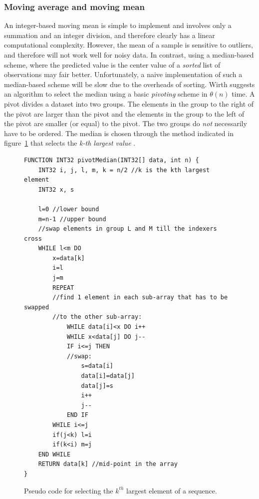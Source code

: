  \subsubsection{Moving average and moving mean}
  An integer-based moving mean is simple to implement and involves only a summation and an integer division, and therefore clearly has a linear computational complexity.
  However, the mean of a sample is sensitive to outliers, and therefore will not work well for noisy data. In contrast, using a median-based scheme,
  where the predicted value is the center value of a \textit{sorted} list of observations may fair better. Unfortunately, a naive implementation of such a 
  median-based scheme will be slow due to the overheads of sorting. Wirth \cite{wirth76} suggests an algorithm to select the median using a basic \textit{pivoting} 
  scheme in $\theta(n)$ time. A pivot divides a dataset into two groups. The elements in the group to the right of the pivot are larger than the pivot and the elements in the group to
  the left of the pivot are smaller (or equal) to the pivot. The two groups do \emph{not} necessarily have to be ordered. The median is chosen through the
  method indicated in figure~\ref{KTH_LARGEST} that selects the \textit{k-th largest value} \cite{wirth76}.
\begin{figure}[ht!]
\begin{mdframed}
\begin{lstlisting}
FUNCTION INT32 pivotMedian(INT32[] data, int n) {
    INT32 i, j, l, m, k = n/2 //k is the kth largest element
    INT32 x, s

    l=0 //lower bound
    m=n-1 //upper bound
    //swap elements in group L and M till the indexers cross
    WHILE l<m DO 
        x=data[k]
        i=l
        j=m
        REPEAT
	    //find 1 element in each sub-array that has to be swapped
	    //to the other sub-array:
            WHILE data[i]<x DO i++
            WHILE x<data[j] DO j--
            IF i<=j THEN
		    //swap:
                s=data[i]
                data[i]=data[j]
                data[j]=s
                i++
                j--
            END IF
        WHILE i<=j
        if(j<k) l=i
        if(k<i) m=j
    END WHILE
    RETURN data[k] //mid-point in the array
}
  \end{lstlisting}
\caption[Pseudo code for selecting the $k^{th}$ largest element of a sequence.]{Pseudo code for selecting the $k^{th}$ largest element of a sequence.}
\label{KTH_LARGEST}
\end{mdframed}
\end{figure}
